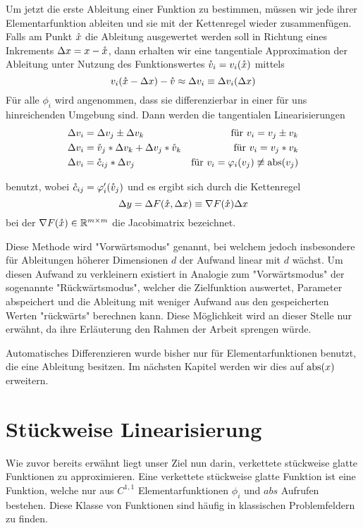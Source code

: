 Um jetzt die erste Ableitung einer Funktion zu bestimmen, müssen wir jede ihrer Elementarfunktion ableiten und sie mit der Kettenregel wieder zusammenfügen. Falls am Punkt $\mathring{x}$ die Ableitung ausgewertet werden soll in Richtung eines Inkrements $\Delta x = x- \mathring{x} $, dann erhalten wir eine tangentiale Approximation der Ableitung unter Nutzung des Funktionswertes $\mathring{v}_i = v_i(\mathring{x})$ mittels 
\begin{equation}
\label{eq:plApproximation}
v_i(\mathring{x} - \Delta x) -\mathring{v} \approx \Delta v_i \equiv \Delta v_i(\Delta x) 
\end{equation}
Für alle $\phi_i$ wird angenommen, dass sie differenzierbar in einer für uns hinreichenden Umgebung sind. Dann werden die tangentialen Linearisierungen
\begin{equation}
\begin{aligned}
\Delta v_i &= \Delta v_j \pm \Delta v_k & \text{für } v_i = v_j \pm v_k\\
\Delta v_i &= \mathring{v}_j* \Delta v_k +\Delta v_j*\mathring{v}_k& \text{für } v_i = v_j * v_k\\
\Delta v_i &= \mathring c_{ij} * \Delta v_j  & \text{für } v_i = \varphi_i(v_j) \not \equiv \operatorname{abs}(v_j)
\end{aligned}
\label{eq:stdAdRules}
\end{equation}

benutzt, wobei $\mathring c_{ij} = \varphi'_i(\mathring{v}_j)$
und es ergibt sich durch die Kettenregel
\[
 \Delta y = \Delta F(\mathring{x},\Delta x) \equiv \nabla F(\mathring{x})\Delta x
\]
bei der $\nabla F(\mathring{x})\in \mathbb{R}^{m\times m}$ die Jacobimatrix bezeichnet.

Diese Methode wird "Vorwärtsmodus" genannt, bei welchem jedoch insbesondere für Ableitungen höherer Dimensionen $d$ der Aufwand linear mit $d$ wächst. Um diesen Aufwand zu verkleinern existiert in Analogie zum "Vorwärtsmodus" der sogenannte "Rückwärtsmodus", welcher die Zielfunktion auswertet, Parameter abspeichert und die Ableitung mit weniger Aufwand aus den gespeicherten Werten "rückwärts" berechnen kann. Diese Möglichkeit wird an dieser Stelle nur erwähnt, da ihre Erläuterung den Rahmen der Arbeit sprengen würde.

Automatisches Differenzieren wurde bisher nur für Elementarfunktionen benutzt, die eine Ableitung besitzen. Im nächsten Kapitel werden wir dies auf $\operatorname{abs}(x)$ erweitern.


\section{Stückweise Linearisierung}
Wie zuvor bereits erwähnt liegt unser Ziel nun darin, verkettete stückweise glatte Funktionen zu approximieren. Eine verkettete stückweise glatte Funktion ist eine Funktion, welche nur aus $C^{1,1}$ Elementarfunktionen $\phi_i$ und $abs$ Aufrufen bestehen. Diese Klasse von Funktionen sind häufig in klassischen Problemfeldern zu finden.

